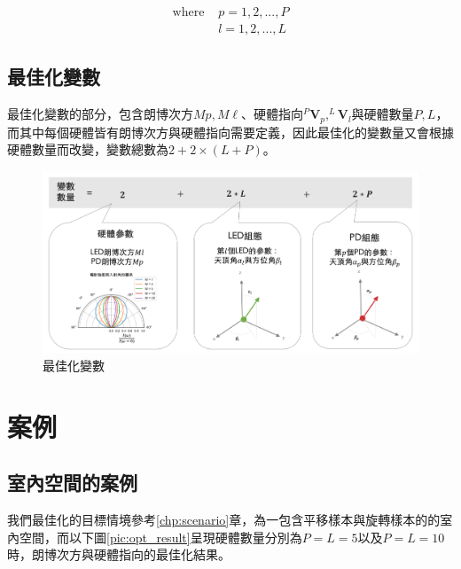     \begin{align*} \text{where }
        &p=1,2,...,P\\&l=1,2,...,L
    \end{align*}


    \subsection{最佳化變數}

    最佳化變數的部分，包含朗博次方$Mp,M\ell$、硬體指向$^{P}\boldsymbol{V}_p,^{L}\boldsymbol{V}_l$與硬體數量$P,L$，而其中每個硬體皆有朗博次方與硬體指向需要定義，因此最佳化的變數量又會根據硬體數量而改變，變數總數為$2+2\times(L+P)$。


    \begin{figure}[h!]
        \centering
        \includegraphics[width=15cm]{ch5pic/optimize_variable.png}
        \caption{最佳化變數}
        \label{pic:optimize_variable}
    \end{figure}



\section{案例}
\label{chp:optimize_case}

    \subsection{室內空間的案例}

    我們最佳化的目標情境參考\ref{chp:scenario}章，為一包含平移樣本與旋轉樣本的的室內空間，而以下圖\ref{pic:opt_result}呈現硬體數量分別為$P=L=5$以及$P=L=10$時，朗博次方與硬體指向的最佳化結果。

